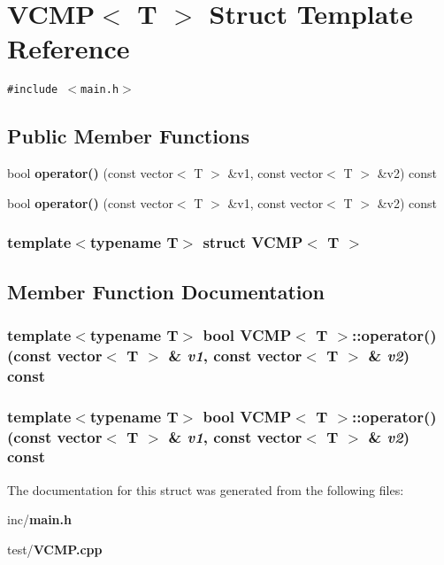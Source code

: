 \section{VCMP$<$ T $>$ Struct Template Reference}
\label{structVCMP}
{\tt \#include $<$main.h$>$}

\subsection*{Public Member Functions}
\begin{CompactItemize}
\item 
bool {\bf operator()} (const vector$<$ T $>$ \&v1, const vector$<$ T $>$ \&v2) const
\item 
bool {\bf operator()} (const vector$<$ T $>$ \&v1, const vector$<$ T $>$ \&v2) const
\end{CompactItemize}
\subsubsection*{template$<$typename T$>$ struct VCMP$<$ T $>$}



\subsection{Member Function Documentation}
\subsubsection{\setlength{\rightskip}{0pt plus 5cm}template$<$typename T$>$ bool {\bf VCMP}$<$ T $>$::operator() (const vector$<$ T $>$ \& {\em v1}, const vector$<$ T $>$ \& {\em v2}) const\hspace{0.3cm}{\tt  [inline]}}\label{structVCMP_c3f602ac214bcde1e773c9319251a38b}


\subsubsection{\setlength{\rightskip}{0pt plus 5cm}template$<$typename T$>$ bool {\bf VCMP}$<$ T $>$::operator() (const vector$<$ T $>$ \& {\em v1}, const vector$<$ T $>$ \& {\em v2}) const\hspace{0.3cm}{\tt  [inline]}}\label{structVCMP_c3f602ac214bcde1e773c9319251a38b}




The documentation for this struct was generated from the following files:\begin{CompactItemize}
\item 
inc/{\bf main.h}\item 
test/{\bf VCMP.cpp}\end{CompactItemize}

